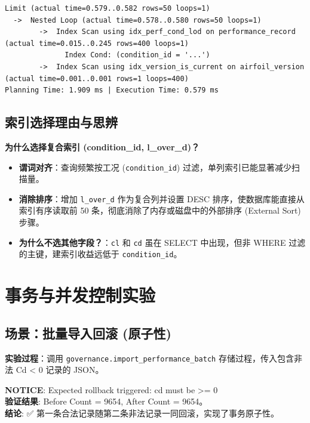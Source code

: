 \documentclass[UTF8,a4paper,11pt]{ctexart}
\begin{document}
\begin{lstlisting}[caption=Phase 2 最佳执行计划文本 (EXPLAIN ANALYZE)]
Limit (actual time=0.579..0.582 rows=50 loops=1)
  ->  Nested Loop (actual time=0.578..0.580 rows=50 loops=1)
        ->  Index Scan using idx_perf_cond_lod on performance_record (actual time=0.015..0.245 rows=400 loops=1)
              Index Cond: (condition_id = '...')
        ->  Index Scan using idx_version_is_current on airfoil_version (actual time=0.001..0.001 rows=1 loops=400)
Planning Time: 1.909 ms | Execution Time: 0.579 ms
\end{lstlisting}

\subsection{索引选择理由与思辨}
\textbf{为什么选择复合索引 (condition\_id, l\_over\_d)？}
\begin{itemize}
    \item \textbf{谓词对齐}：查询频繁按工况 (\texttt{condition\_id}) 过滤，单列索引已能显著减少扫描量。
    \item \textbf{消除排序}：增加 \texttt{l\_over\_d} 作为复合列并设置 DESC 排序，使数据库能直接从索引有序读取前 50 条，彻底消除了内存或磁盘中的外部排序 (External Sort) 步骤。
    \item \textbf{为什么不选其他字段？}：\texttt{cl} 和 \texttt{cd} 虽在 SELECT 中出现，但非 WHERE 过滤的主键，建索引收益远低于 \texttt{condition\_id}。
\end{itemize}

\section{事务与并发控制实验}

\subsection{场景：批量导入回滚 (原子性)}
\textbf{实验过程}：调用 \texttt{governance.import\_performance\_batch} 存储过程，传入包含非法 Cd < 0 记录的 JSON。
\begin{tcolorbox}[colback=red!5, colframe=red!50, title=原子性验证结果]
    \textbf{NOTICE}: Expected rollback triggered: cd must be >= 0 \\
    \textbf{验证结果}: Before Count = 9654, After Count = 9654。\\
    \textbf{结论}: ✅ 第一条合法记录随第二条非法记录一同回滚，实现了事务原子性。
\end{tcolorbox}
\end{document}
